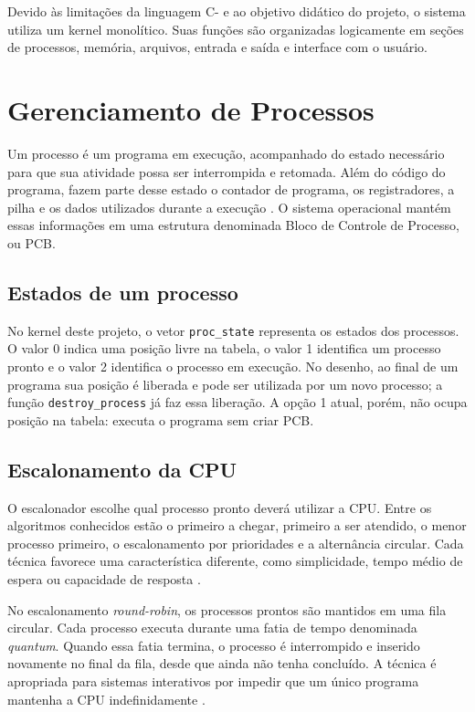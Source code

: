 \documentclass[
    12pt,
    openright,
    a4paper,
    english,
    brazilian
]{abntex2}
\begin{document}
Devido às limitações da linguagem C- e ao objetivo didático do projeto, o sistema utiliza um kernel monolítico. Suas funções são organizadas logicamente em seções de processos, memória, arquivos, entrada e saída e interface com o usuário.

\section{Gerenciamento de Processos}

Um processo é um programa em execução, acompanhado do estado necessário para que sua atividade possa ser interrompida e retomada. Além do código do programa, fazem parte desse estado o contador de programa, os registradores, a pilha e os dados utilizados durante a execução \cite{tanenbaum2016}. O sistema operacional mantém essas informações em uma estrutura denominada Bloco de Controle de Processo, ou PCB.

\subsection{Estados de um processo}

No kernel deste projeto, o vetor \texttt{proc\_state} representa os estados dos processos. O valor 0 indica uma posição livre na tabela, o valor 1 identifica um processo pronto e o valor 2 identifica o processo em execução. No desenho, ao final de um programa sua posição é liberada e pode ser utilizada por um novo processo; a função \texttt{destroy\_process} já faz essa liberação. A opção 1 atual, porém, não ocupa posição na tabela: executa o programa sem criar PCB.

\subsection{Escalonamento da CPU}

O escalonador escolhe qual processo pronto deverá utilizar a CPU. Entre os algoritmos conhecidos estão o primeiro a chegar, primeiro a ser atendido, o menor processo primeiro, o escalonamento por prioridades e a alternância circular. Cada técnica favorece uma característica diferente, como simplicidade, tempo médio de espera ou capacidade de resposta \cite{silberschatz2015,stallings2018}.

No escalonamento \emph{round-robin}, os processos prontos são mantidos em uma fila circular. Cada processo executa durante uma fatia de tempo denominada \emph{quantum}. Quando essa fatia termina, o processo é interrompido e inserido novamente no final da fila, desde que ainda não tenha concluído. A técnica é apropriada para sistemas interativos por impedir que um único programa mantenha a CPU indefinidamente \cite{arpaci2018}.
\end{document}
